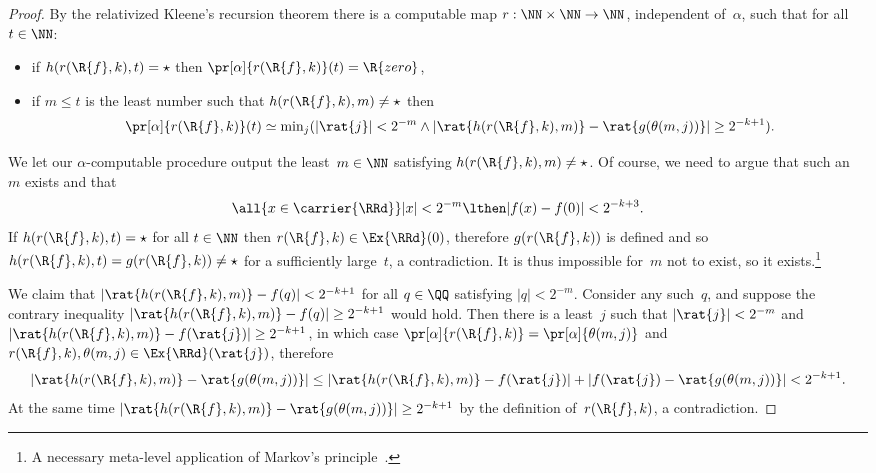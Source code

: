 \begin{proof}
  By the relativized Kleene's recursion theorem there is a computable map $r : \NN \times \NN \to \NN$, independent of~$\alpha$, such that for all $t \in \NN$:
  \begin{itemize}
  \item if $h(r(\R{f}, k),t) = \star$ then $\pr[\alpha]{r(\R{f}, k)}(t) = \R{zero}$,
  \item if $m \leq t$ is the least number such that $h(r(\R{f}, k), m) \neq \star$ then
    \begin{equation*}
      \pr[\alpha]{r(\R{f}, k)}(t) \simeq
      \min\nolimits_j (|\rat{j}| < 2^{-m} \land |\rat{h(r(\R{f}, k), m)} - \rat{g(\theta(m,j))}| \geq 2^{-k+1}).
    \end{equation*}
  \end{itemize}

  We let our $\alpha$-computable procedure output the least~$m \in \NN$ satisfying $h(r(\R{f}, k), m) \neq \star$.
  Of course, we need to argue that such an~$m$ exists and that
  \begin{equation}
    \label{eq:klst-1}
    \all{x \in \carrier{\RRd}}
    |x| < 2^{-m} \lthen |f(x) - f(0)| < 2^{-k + 3}.
  \end{equation}
  If $h(r(\R{f}, k), t) = \star$ for all $t \in \NN$ then $r(\R{f}, k) \in \Ex{\RRd}(0)$,
  therefore $g(r(\R{f}, k))$ is defined and so $h(r(\R{f}, k), t) = g(r(\R{f}, k)) \neq \star$ for a sufficiently large~$t$, a contradiction.
  It is thus impossible for~$m$ not to exist, so it exists.\footnote{A necessary meta-level application of Markov's principle~\cite{beeson84:_churc}.}

  We claim that $|\rat{h(r(\R{f},k),m)} - f(q)| < 2^{-k+1}$ for all $q \in \QQ$ satisfying $|q| < 2^{-m}$.
  Consider any such~$q$, and suppose the contrary inequality $|\rat{h(r(\R{f},k),m)} - f(q)| \geq 2^{-k+1}$ would hold.
  Then there is a least~$j$ such that $|\rat{j}| < 2^{-m}$ and $|\rat{h(r(\R{f},k),m)} - f(\rat{j})| \geq 2^{-k+1}$,
  in which case $\pr[\alpha]{r(\R{f},k)} = \pr[\alpha]{\theta(m,j)}$ and $r(\R{f},k), \theta(m,j) \in \Ex{\RRd}(\rat{j})$, therefore
  \begin{equation*}
    |\rat{h(r(\R{f}, k), m)} - \rat{g(\theta(m,j))}| \leq
    |\rat{h(r(\R{f}, k), m)} - f(\rat{j})| + |f(\rat{j}) - \rat{g(\theta(m,j))}| < 2^{-k + 1}.
  \end{equation*}
  At the same time $|\rat{h(r(\R{f}, k), m)} - \rat{g(\theta(m,j))}| \geq 2^{-k + 1}$ by the definition of~$r(\R{f}, k)$, a contradiction.


\end{proof}
